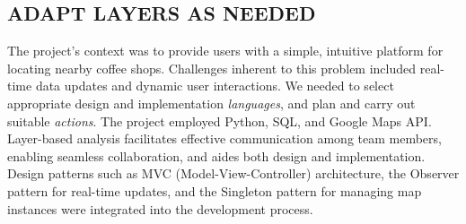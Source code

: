 \subsection*{\normalsize{} ADAPT LAYERS AS NEEDED {\hfill \cognitive}}
The project's context was to provide users with a simple, intuitive
platform for locating nearby coffee shops. Challenges inherent to this
problem included real-time data updates and dynamic user interactions.
We needed to select appropriate design and implementation
\emph{languages}, and plan and carry out suitable \emph{actions}.
The project employed Python, SQL, and Google Maps API. Layer-based
analysis facilitates effective communication among team members,
enabling seamless collaboration, and aides both design and
implementation.
Design patterns such
as {\scitshape MVC (Model-View-Controller) architecture}, the
{\scitshape Observer} pattern for real-time updates, and the
{\scitshape Singleton} pattern for managing map instances were
integrated into the development process.
